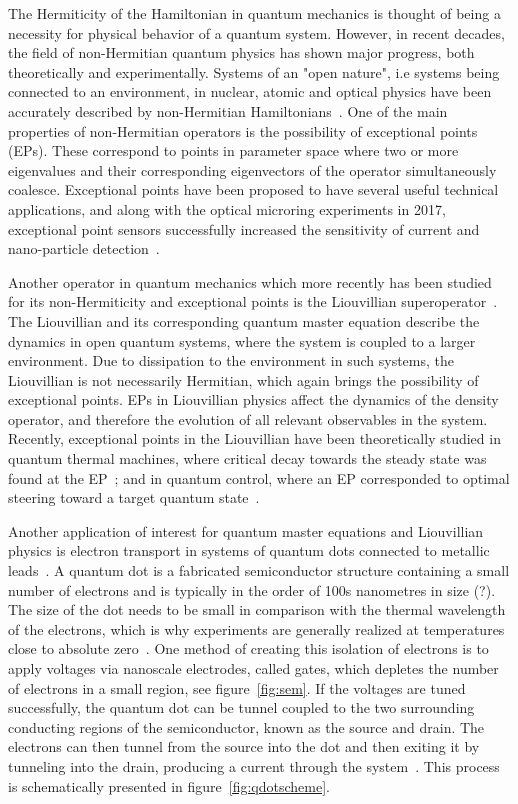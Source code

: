 \documentclass[../main.tex]{subfiles}
\begin{document}
The Hermiticity of the Hamiltonian in quantum mechanics is thought of being a necessity for physical behavior of a quantum system. However, in recent decades, the field of non-Hermitian quantum physics has shown major progress, both theoretically and experimentally. Systems of an "open nature", i.e systems being connected to an environment, in nuclear, atomic and optical physics have been accurately described by non-Hermitian Hamiltonians~\cite{nonHermrev}. One of the main properties of non-Hermitian operators is the possibility of exceptional points (EPs). These correspond to points in parameter space where two or more eigenvalues and their corresponding eigenvectors of the operator simultaneously coalesce. Exceptional points have been proposed to have several useful technical applications, and along with the optical microring experiments in 2017, exceptional point sensors successfully increased the sensitivity of current and nano-particle detection~\cite{microring1, microring2}.

Another operator in quantum mechanics which more recently has been studied for its non-Hermiticity and exceptional points is the Liouvillian superoperator~\cite{recentliou, thermal, steering}. The Liouvillian and its corresponding quantum master equation describe the dynamics in open quantum systems, where the system is coupled to a larger environment. Due to dissipation to the environment in such systems, the Liouvillian is not necessarily Hermitian, which again brings the possibility of exceptional points. EPs in Liouvillian physics affect the dynamics of the density operator, and therefore the evolution of all relevant observables in the system. Recently, exceptional points in the Liouvillian have been theoretically studied in quantum thermal machines, where critical decay towards the steady state was found at the EP~\cite{thermal}; and in quantum control, where an EP corresponded to optimal steering toward a target quantum state~\cite{steering}. 

Another application of interest for quantum master equations and Liouvillian physics is electron transport in systems of quantum dots connected to metallic leads~\cite{qdottrans}. A quantum dot is a fabricated semiconductor structure containing a small number of electrons and is typically in the order of 100s nanometres in size (?). The size of the dot needs to be small in comparison with the thermal wavelength of the electrons, which is why experiments are generally realized at temperatures close to absolute zero~\cite{transport}. One method of creating this isolation of electrons is to apply voltages via nanoscale electrodes, called gates, which depletes the number of electrons in a small region, see figure~\ref{fig:sem}. If the voltages are tuned successfully, the quantum dot can be tunnel coupled to the two surrounding conducting regions of the semiconductor, known as the source and drain. The electrons can then tunnel from the source into the dot and then exiting it by tunneling into the drain, producing a current through the system~\cite{qdotmarcus}. This process is schematically presented in figure~\ref{fig:qdotscheme}.
\end{document}
